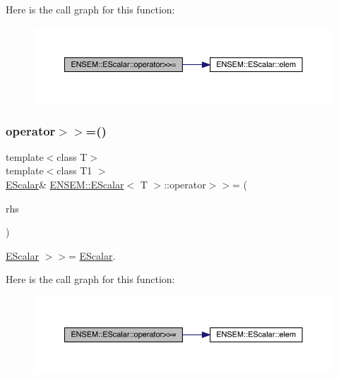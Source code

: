 Here is the call graph for this function\+:
\nopagebreak
\begin{figure}[H]
\begin{center}
\leavevmode
\includegraphics[width=350pt]{d0/d82/classENSEM_1_1EScalar_a0e520529327800038c3775d195819b6f_cgraph}
\end{center}
\end{figure}
\mbox{\label{classENSEM_1_1EScalar_a0e520529327800038c3775d195819b6f}} 
\subsubsection{\texorpdfstring{operator$>$$>$=()}{operator>>=()}\hspace{0.1cm}{\footnotesize\ttfamily [3/3]}}
{\footnotesize\ttfamily template$<$class T$>$ \\
template$<$class T1 $>$ \\
\mbox{\hyperlink{classENSEM_1_1EScalar}{E\+Scalar}}\& \mbox{\hyperlink{classENSEM_1_1EScalar}{E\+N\+S\+E\+M\+::\+E\+Scalar}}$<$ T $>$\+::operator$>$$>$= (\begin{DoxyParamCaption}\item[{const \mbox{\hyperlink{classENSEM_1_1EScalar}{E\+Scalar}}$<$ T1 $>$ \&}]{rhs }\end{DoxyParamCaption})\hspace{0.3cm}{\ttfamily [inline]}}



\mbox{\hyperlink{classENSEM_1_1EScalar}{E\+Scalar}} $>$$>$= \mbox{\hyperlink{classENSEM_1_1EScalar}{E\+Scalar}}. 

Here is the call graph for this function\+:
\nopagebreak
\begin{figure}[H]
\begin{center}
\leavevmode
\includegraphics[width=350pt]{d0/d82/classENSEM_1_1EScalar_a0e520529327800038c3775d195819b6f_cgraph}
\end{center}
\end{figure}
\mbox{\label{classENSEM_1_1EScalar_a20c80375941641aca36355253b3479ac}} 
